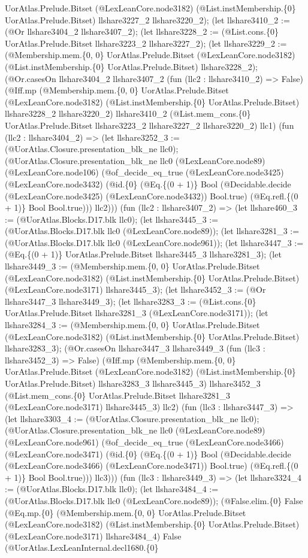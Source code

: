 \documentclass[11pt]{article}
\begin{document}
UorAtlas.Prelude.Bitset (@LexLeanCore.node3182) (@List.instMembership.\{0\} UorAtlas.Prelude.Bitset) llshare3227\_2 llshare3220\_2); (let llshare3410\_2 := (@Or llshare3404\_2 llshare3407\_2); (let llshare3228\_2 := (@List.cons.\{0\} UorAtlas.Prelude.Bitset llshare3223\_2 llshare3227\_2); (let llshare3229\_2 := (@Membership.mem.\{0, 0\} UorAtlas.Prelude.Bitset (@LexLeanCore.node3182) (@List.instMembership.\{0\} UorAtlas.Prelude.Bitset) llshare3228\_2); (@Or.casesOn llshare3404\_2 llshare3407\_2 (fun (llc2 : llshare3410\_2) => False) (@Iff.mp (@Membership.mem.\{0, 0\} UorAtlas.Prelude.Bitset (@LexLeanCore.node3182) (@List.instMembership.\{0\} UorAtlas.Prelude.Bitset) llshare3228\_2 llshare3220\_2) llshare3410\_2 (@List.mem\_cons.\{0\} UorAtlas.Prelude.Bitset llshare3223\_2 llshare3227\_2 llshare3220\_2) llc1) (fun (llc2 : llshare3404\_2) => (let llshare3252\_3 := (@UorAtlas.Closure.presentation\_blk\_ne llc0); (@UorAtlas.Closure.presentation\_blk\_ne llc0 (@LexLeanCore.node89) (@LexLeanCore.node106) (@of\_decide\_eq\_true (@LexLeanCore.node3425) (@LexLeanCore.node3432) (@id.\{0\} (@Eq.\{(0 + 1)\} Bool (@Decidable.decide (@LexLeanCore.node3425) (@LexLeanCore.node3432)) Bool.true) (@Eq.refl.\{(0 + 1)\} Bool Bool.true))) llc2))) (fun (llc2 : llshare3407\_2) => (let llshare460\_3 := (@UorAtlas.Blocks.D17.blk llc0); (let llshare3445\_3 := (@UorAtlas.Blocks.D17.blk llc0 (@LexLeanCore.node89)); (let llshare3281\_3 := (@UorAtlas.Blocks.D17.blk llc0 (@LexLeanCore.node961)); (let llshare3447\_3 := (@Eq.\{(0 + 1)\} UorAtlas.Prelude.Bitset llshare3445\_3 llshare3281\_3); (let llshare3449\_3 := (@Membership.mem.\{0, 0\} UorAtlas.Prelude.Bitset (@LexLeanCore.node3182) (@List.instMembership.\{0\} UorAtlas.Prelude.Bitset) (@LexLeanCore.node3171) llshare3445\_3); (let llshare3452\_3 := (@Or llshare3447\_3 llshare3449\_3); (let llshare3283\_3 := (@List.cons.\{0\} UorAtlas.Prelude.Bitset llshare3281\_3 (@LexLeanCore.node3171)); (let llshare3284\_3 := (@Membership.mem.\{0, 0\} UorAtlas.Prelude.Bitset (@LexLeanCore.node3182) (@List.instMembership.\{0\} UorAtlas.Prelude.Bitset) llshare3283\_3); (@Or.casesOn llshare3447\_3 llshare3449\_3 (fun (llc3 : llshare3452\_3) => False) (@Iff.mp (@Membership.mem.\{0, 0\} UorAtlas.Prelude.Bitset (@LexLeanCore.node3182) (@List.instMembership.\{0\} UorAtlas.Prelude.Bitset) llshare3283\_3 llshare3445\_3) llshare3452\_3 (@List.mem\_cons.\{0\} UorAtlas.Prelude.Bitset llshare3281\_3 (@LexLeanCore.node3171) llshare3445\_3) llc2) (fun (llc3 : llshare3447\_3) => (let llshare3303\_4 := (@UorAtlas.Closure.presentation\_blk\_ne llc0); (@UorAtlas.Closure.presentation\_blk\_ne llc0 (@LexLeanCore.node89) (@LexLeanCore.node961) (@of\_decide\_eq\_true (@LexLeanCore.node3466) (@LexLeanCore.node3471) (@id.\{0\} (@Eq.\{(0 + 1)\} Bool (@Decidable.decide (@LexLeanCore.node3466) (@LexLeanCore.node3471)) Bool.true) (@Eq.refl.\{(0 + 1)\} Bool Bool.true))) llc3))) (fun (llc3 : llshare3449\_3) => (let llshare3324\_4 := (@UorAtlas.Blocks.D17.blk llc0); (let llshare3484\_4 := (@UorAtlas.Blocks.D17.blk llc0 (@LexLeanCore.node89)); (@False.elim.\{0\} False (@Eq.mp.\{0\} (@Membership.mem.\{0, 0\} UorAtlas.Prelude.Bitset (@LexLeanCore.node3182) (@List.instMembership.\{0\} UorAtlas.Prelude.Bitset) (@LexLeanCore.node3171) llshare3484\_4) False (@UorAtlas.LexLeanInternal.decl1680.\{0\} 
\end{document}
